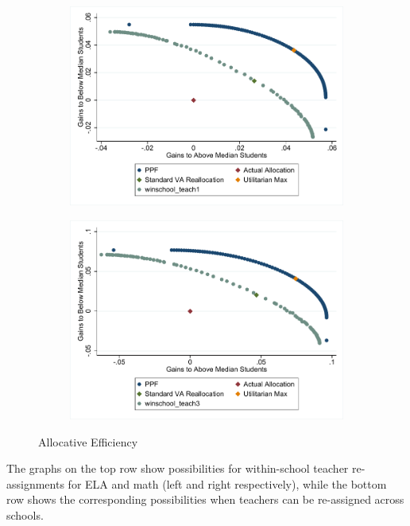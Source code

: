 \documentclass[12pt]{article}
\theoremstyle{definition}
\theoremstyle{definition}
\theoremstyle{definition}
\theoremstyle{definition}
\begin{document}
\begin{figure}[H]
    \begin{subfigure}[b]{0.45\textwidth}
        \includegraphics[width=1\textwidth]{Working_Paper/WP_Figures/AcrossSchoolReallocationELAandStVA.pdf}
    \end{subfigure}
    \begin{subfigure}[b]{0.45\textwidth}
        \includegraphics[width=1\textwidth]{Working_Paper/WP_Figures/AcrossSchoolReallocationMathandStVA.pdf}
    \end{subfigure}
    \caption{Allocative Efficiency}
    \label{fig:aloc_eff}
\end{figure}

The graphs on the top row show possibilities for within-school teacher re-assignments for ELA and math (left and right respectively), while the bottom row shows the corresponding possibilities when teachers can be re-assigned across schools. 
\end{document}
